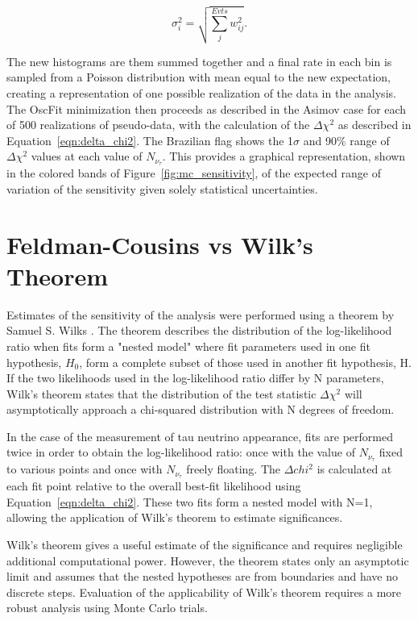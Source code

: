 \begin{equation}
	\sigma^{2}_{i} = \sqrt{\sum_j^{Evts} w^2_{ij}} .
\end{equation}

The new histograms are them summed together and a final rate in each bin is sampled from a Poisson distribution with mean equal to the new expectation, creating a representation of one possible realization of the data in the analysis.
The OscFit minimization then proceeds as described in the Asimov case for each of 500 realizations of pseudo-data, with the calculation of the $\Delta \chi^2$ as described in Equation~\ref{eqn:delta_chi2}.
The Brazilian flag shows the 1$\sigma$ and 90\% range of $\Delta \chi^2$ values at each value of $N_{\nu_{\tau}}$.
This provides a graphical representation, shown in the colored bands of Figure~\ref{fig:mc_sensitivity}, of the expected range of variation of the sensitivity given solely statistical uncertainties.


\label{subsec:wilks}
\section{Feldman-Cousins vs Wilk's Theorem}
Estimates of the sensitivity of the analysis were performed using a theorem by Samuel S. Wilks \cite{wilks}.
The theorem describes the distribution of the log-likelihood ratio when fits form a "nested model" where fit parameters used in one fit hypothesis, ${H_0}$, form a complete subset of those used in another fit hypothesis, H.
If the two likelihoods used in the log-likelihood ratio differ by N parameters, Wilk's theorem states that the distribution of the test statistic $\Delta \chi^2$ will asymptotically approach a chi-squared distribution with N degrees of freedom.

In the case of the measurement of tau neutrino appearance, fits are performed twice in order to obtain the log-likelihood ratio: once with the value of ${N_{\nu_\tau}}$ fixed to various points and once with ${N_{\nu_\tau}}$ freely floating.
The $\Delta chi^2$ is calculated at each fit point relative to the overall best-fit likelihood using Equation~\ref{eqn:delta_chi2}.
These two fits form a nested model with N=1, allowing the application of Wilk's theorem to estimate significances.

Wilk's theorem gives a useful estimate of the significance and requires negligible additional computational power.
However, the theorem states only an asymptotic limit and assumes that the nested hypotheses are from boundaries and have no discrete steps.
Evaluation of the applicability of Wilk's theorem requires a more robust analysis using Monte Carlo trials.

